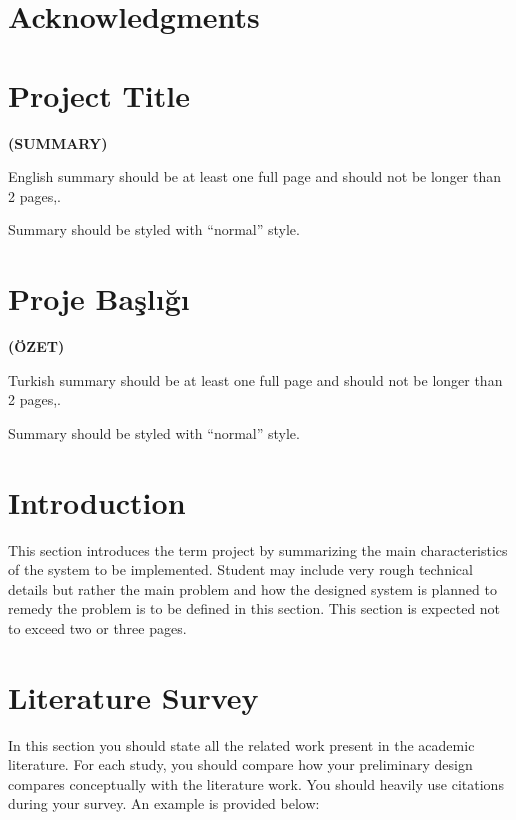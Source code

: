 \documentclass[a4paper, 12pt, titlepage]{article}
\newcommand{\thetitle}{Project Title}
\newcommand{\theturkishtitle}{Proje Başlığı}
\begin{document}
\newpage
\section*{Acknowledgments}

\newpage
\section*{\centering\thetitle}
\centerline{\fontsize{16pt}{21.6pt}\sffamily\bfseries (SUMMARY)}

English summary should be at least one full page and should not be longer than 2 pages,.

Summary should be styled with “normal” style.


\newpage
\section*{\centering\theturkishtitle}
\centerline{\fontsize{16pt}{21.6pt}\sffamily\bfseries (ÖZET)}


Turkish summary should be at least one full page and should not be longer than 2 pages,.

Summary should be styled with “normal” style.


\newpage
\tableofcontents
\newpage

\section{Introduction}

This section introduces the term project by summarizing the main characteristics of the system to be implemented. Student may include very rough technical details but rather the main problem and how the designed system is planned to remedy the problem is to be defined in this section. This section is expected not to exceed two or three pages.

\newpage
\section{Literature Survey}

In this section you should state all the related work present in the academic literature. For each study, you should compare how your preliminary design compares conceptually with the literature work. You should heavily use citations during your survey. An example is provided below:
\end{document}
